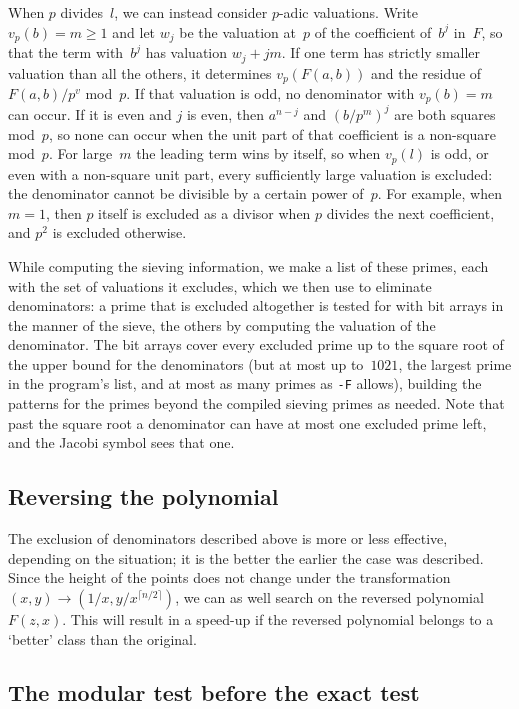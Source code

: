 \documentclass[12pt,a4paper,oneside]{amsart}
\begin{document}
When $p$ divides~$l$, we can instead consider $p$-adic valuations.
Write $v_p(b) = m \ge 1$ and let $w_j$ be
the valuation at~$p$ of the coefficient of~$b^j$ in~$F$, so that the term
with~$b^j$ has valuation $w_j + jm$. If one term has strictly smaller
valuation than all the others, it determines $v_p(F(a,b))$ and the residue
of $F(a,b)/p^{v}$ mod~$p$. If that valuation is odd, no denominator with
$v_p(b) = m$ can occur. If it is even and $j$ is even, then $a^{n-j}$ and
$(b/p^m)^j$ are both squares mod~$p$, so none can occur when the unit part
of that coefficient is a non-square mod~$p$.
For large~$m$ the leading term wins by itself, so when $v_p(l)$ is
odd, or even with a non-square unit part, every sufficiently large valuation
is excluded: the denominator cannot be divisible by a certain power of~$p$.
For example, when $m = 1$, then $p$ itself is excluded as a divisor
when $p$ divides the next coefficient, and $p^2$ is excluded otherwise.

While computing the sieving information, we make a list of these primes,
each with the set of valuations it excludes, which we then use to eliminate
denominators: a prime that is excluded altogether is tested for with bit
arrays in the manner of the sieve, the others by computing the valuation of
the denominator. The bit arrays cover every excluded prime up to the square
root of the upper bound for the denominators (but at most up to~$1021$, the
largest prime in the program's list, and at most as many primes as
\verb+-F+ allows), building the patterns for the
primes beyond the compiled sieving primes as needed.
Note that past the square root a denominator can have at most one excluded
prime left, and the Jacobi symbol sees that one.

\subsection{Reversing the polynomial}

The exclusion of denominators described above is more or less effective,
depending on the situation; it is the better the earlier the case was
described. Since the height of the points does not change under the
transformation $(x,y) \to (1/x, y/x^{\lceil n/2 \rceil})$, we can as well search on the
reversed polynomial $F(z,x)$. This will result in a speed-up if the
reversed polynomial belongs to a `better' class than the original.

\subsection{The modular test before the exact test}\label{sec:modtest}
\end{document}

